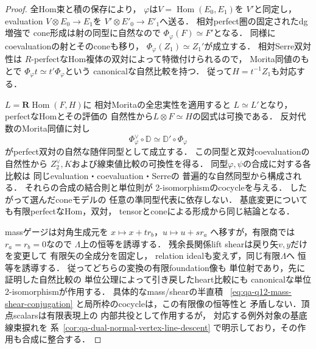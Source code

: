 \begin{proof}
全Hom束と積の保存により，
$\varphi$は$V=\operatorname{Hom}(E_0,E_1)$を
$V'$と同定し，evaluation
$V\otimes E_0\to E_1$を
$V'\otimes E'_0\to E'_1$へ送る．
相対perfect圏の固定されたdg増強で
cone形成は射の同型に自然なので
$\Phi_\varphi(F)\simeq F'$となる．
同様にcoevaluationの射とそのconeも移り，
$\Phi_\varphi(Z_1)\simeq Z_1'$が成立する．
相対Serre双対性は
$R$-perfectなHom複体の双対によって特徴付けられるので，
Morita同値のもとで
$\Phi_\varphi t\simeq t'\Phi_\varphi$という
canonicalな自然比較を持つ．
従って$H=t^{-1}Z_1$も対応する．

$L=\mathbf R\operatorname{Hom}(F,H)$に
相対Moritaの全忠実性を適用すると
$L\simeq L'$となり，perfectなHomとその評価の
自然性から$L\otimes F\simeq H$の図式は可換である．
反対代数のMorita同値に対し
\[
 \Phi_\varphi^\vee\circ\mathbb D
 \simeq\mathbb D'\circ\Phi_\varphi
\]
がperfect双対の自然な随伴同型として成立する．
この同型と双対coevaluationの自然性から
$Z_2^\vee,K$および線束値比較の可換性を得る．
同型$\varphi,\psi$の合成に対する各比較は
同じevaluation・coevaluation・Serreの
普遍的な自然同型から構成される．
それらの合成の結合則と単位則が
2-isomorphismのcocycleを与える．
したがって選んだconeモデルの
任意の準同型代表に依存しない．
基底変更についても有限perfectなHom，双対，
tensorとconeによる形成から同じ結論となる．

massゲージは対角生成元を
$x\mapsto x+t r_b$，$u\mapsto u+s r_a$
へ移すが，有限商では$r_a=r_b=0$なので
$\Lambda$上の恒等を誘導する．
残余長関係lift shearは戻り矢$v,y$だけを変更して
有限矢の全成分を固定し，
relation idealも変えず，同じ有限$\Lambda$へ
恒等を誘導する．
従ってどちらの変換の有限foundation像も
単位射であり，先に証明した自然比較の
単位公理によって引き戻したheart比較にも
canonicalな単位2-isomorphismが作用する．
具体的なmass/shearの半直積
~\eqref{eq:qa-q12-mass-shear-conjugation}
と局所枠のcocycleは，この有限像の恒等性と
矛盾しない．頂点scalarsは有限表現上の
内部共役として作用するが，
対応する例外対象の基底線束捩れを
系~\ref{cor:qa-dual-normal-vertex-line-descent}
で明示しており，その作用も合成に整合する．
\end{proof}


